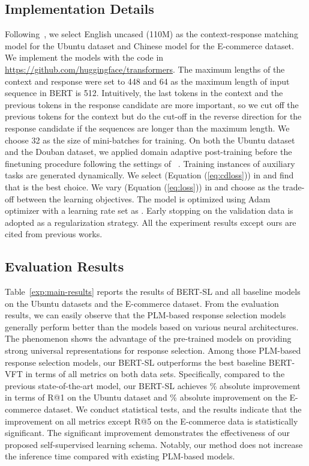 \documentclass{article}
\begin{document}
\subsection{Implementation Details} 
Following~\citet{gu2020speaker}, we select English uncased  (110M) as the context-response matching model for the Ubuntu dataset and Chinese  model for the E-commerce dataset. We implement the models with the code in \url{https://github.com/huggingface/transformers}.
The maximum lengths of the context and response were set to 448 and 64 as the maximum length of input sequence in BERT is 512.
Intuitively, the last tokens in the context and the previous tokens in the response candidate are more important, so we cut off the previous tokens for the context but do the cut-off in the reverse direction for the response candidate if the sequences are longer than the maximum length.
We choose 32 as the size of mini-batches for training.
On both the Ubuntu dataset and the Douban dataset, we applied domain adaptive post-training before the finetuning procedure following the settings of ~\citet{whang2020domain}.
Training instances of auxiliary tasks are generated dynamically.
We select  (Equation (\ref{eq:cdloss})) in  and find that  is the best choice.
We vary  (Equation (\ref{eq:loss})) in  and choose  as the trade-off between the learning objectives.
The model is optimized using Adam optimizer with a learning rate set as .
Early stopping on the validation data is adopted as a regularization strategy. 
All the experiment results except ours are cited from previous works.

\subsection{Evaluation Results}
Table~\ref{exp:main-results} reports the results of BERT-SL and all baseline models on the Ubuntu datasets and the E-commerce dataset.
From the evaluation results, we can easily observe that the PLM-based response selection models generally perform better than the models based on various neural architectures. The phenomenon shows the advantage of the pre-trained models on providing strong universal representations for response selection.
Among those PLM-based response selection models, our BERT-SL outperforms the best baseline BERT-VFT in terms of all metrics on both data sets. Specifically, compared to the previous state-of-the-art model, our BERT-SL achieves \% absolute improvement in terms of R@1 on the Ubuntu dataset and \% absolute improvement on the E-commerce dataset. We conduct statistical tests, and the results indicate that the improvement on all metrics except R@5 on the E-commerce data is statistically significant. The significant improvement demonstrates the effectiveness of our proposed self-supervised learning schema. 
Notably, our method does not increase the inference time compared with existing PLM-based models.
\end{document}
